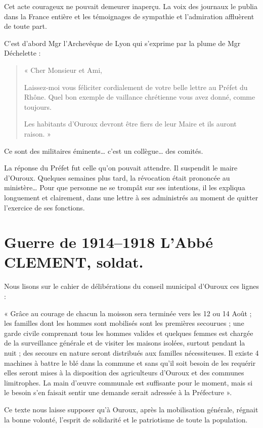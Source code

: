 Cet acte courageux ne pouvait demeurer inaperçu. La voix des journaux le publia dans la France entière et les témoignages de sympathie et l'admiration affluèrent de toute part.

C'est d'abord Mgr l'Archevêque de Lyon qui s'exprime par la plume de Mgr Déchelette :

\begin{quote}
« Cher Monsieur et Ami,

Laissez-moi vous féliciter cordialement de votre belle lettre au Préfet du Rhône. Quel bon exemple de vaillance chrétienne vous avez donné, comme toujours.

Les habitants d'Ouroux devront être fiers de leur Maire et ils auront raison. »
\end{quote}

Ce sont des militaires éminents… c'est un collègue… des comités.

La réponse du Préfet fut celle qu'on pouvait attendre. Il suspendit le maire d'Ouroux. Quelques semaines plus tard, la révocation était prononcée au ministère… Pour que personne ne se trompât sur ses intentions, il les expliqua longuement et clairement, dans une lettre à ses administrés au moment de quitter l'exercice de ses fonctions.

\section*{Guerre de 1914--1918  L'Abbé CLEMENT, soldat.}

Nous lisons sur le cahier de délibérations du conseil municipal d'Ouroux ces lignes :

« Grâce au courage de chacun la moisson sera terminée vers les 12 ou 14 Août ; les familles dont les hommes sont mobilisés sont les premières secourues ; une garde civile comprenant tous les hommes valides et quelques femmes est chargée de la surveillance générale et de visiter les maisons isolées, surtout pendant la nuit ; des secours en nature seront distribués aux familles nécessiteuses. Il existe 4 machines à battre le blé dans la commune et sans qu'il soit besoin de les requérir elles seront mises à la disposition des agriculteurs d'Ouroux et des communes limitrophes. La main d'œuvre communale est suffisante pour le moment, mais si le besoin s'en faisait sentir une demande serait adressée à la Préfecture ».

Ce texte nous laisse supposer qu'à Ouroux, après la mobilisation générale, régnait la bonne volonté, l'esprit de solidarité et le patriotisme de toute la population.

